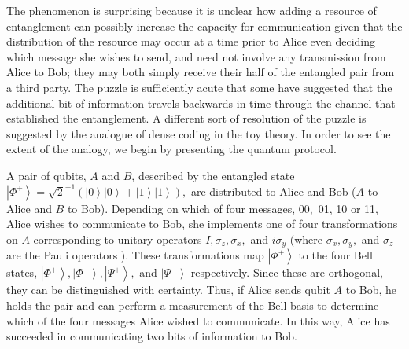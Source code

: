 \documentclass[pra,twocolumn,nofootinbib,showpacs]{revtex4}
\begin{document}
The phenomenon is surprising because it is unclear how adding a resource of
entanglement can possibly increase the capacity for communication given that
the distribution of the resource may occur at a time prior to Alice even
deciding which message she wishes to send, and need not involve any
transmission from Alice to Bob; they may both simply receive their half of
the entangled pair from a third party. The puzzle is sufficiently acute that
some have suggested that the additional bit of information travels backwards
in time through the channel that established the entanglement. A different
sort of resolution of the puzzle is suggested by the analogue of dense
coding in the toy theory. In order to see the extent of the analogy, we
begin by presenting the quantum protocol.

A pair of qubits, $A$ and $B$, described by the entangled state $\left| \Phi
^{+}\right\rangle =\sqrt{2}^{-1}(\left| 0\right\rangle \left| 0\right\rangle
+\left| 1\right\rangle \left| 1\right\rangle ),$ are distributed to Alice
and Bob ($A$ to Alice and $B$ to Bob). Depending on which of four messages, $%
00,$ 01, 10 or 11, Alice wishes to communicate to Bob, she implements one of
four transformations on $A$ corresponding to unitary operators $I,\sigma
_{z},\sigma _{x},$ and $i\sigma _{y}$ (where $\sigma _{x},\sigma _{y},$ and $%
\sigma _{z}$ are the Pauli operators \cite{NielsenChuang}). These
transformations map $\left| \Phi ^{+}\right\rangle $ to the four Bell
states, $\left| \Phi ^{+}\right\rangle ,\left| \Phi ^{-}\right\rangle
,\left| \Psi ^{+}\right\rangle ,$ and $\left| \Psi ^{-}\right\rangle $
respectively. Since these are orthogonal, they can be distinguished with
certainty. Thus, if Alice sends qubit $A$ to Bob, he holds the pair and can
perform a measurement of the Bell basis to determine which of the four
messages Alice wished to communicate. In this way, Alice has succeeded in
communicating two bits of information to Bob.
\end{document}
